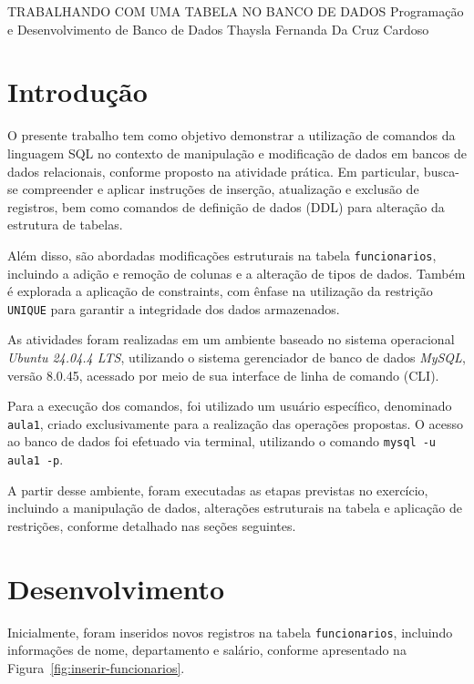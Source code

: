 \documentclass[12pt,a4paper]{article}
\begin{document}
\montarinicio
    {TRABALHANDO COM UMA TABELA NO BANCO DE DADOS}
    {Programação e Desenvolvimento de Banco de Dados}
    {Thaysla Fernanda Da Cruz Cardoso}

\section{Introdução}

O presente trabalho tem como objetivo demonstrar a utilização de comandos da linguagem SQL no contexto de manipulação e modificação de dados em bancos de dados relacionais, conforme proposto na atividade prática. Em particular, busca-se compreender e aplicar instruções de inserção, atualização e exclusão de registros, bem como comandos de definição de dados (DDL) para alteração da estrutura de tabelas.

Além disso, são abordadas modificações estruturais na tabela \texttt{funcionarios}, incluindo a adição e remoção de colunas e a alteração de tipos de dados. Também é explorada a aplicação de constraints, com ênfase na utilização da restrição \texttt{UNIQUE} para garantir a integridade dos dados armazenados.

As atividades foram realizadas em um ambiente baseado no sistema operacional \textit{Ubuntu 24.04.4 LTS}, utilizando o sistema gerenciador de banco de dados \textit{MySQL}, versão 8.0.45, acessado por meio de sua interface de linha de comando (CLI).

Para a execução dos comandos, foi utilizado um usuário específico, denominado \texttt{aula1}, criado exclusivamente para a realização das operações propostas. O acesso ao banco de dados foi efetuado via terminal, utilizando o comando \texttt{mysql -u aula1 -p}.

A partir desse ambiente, foram executadas as etapas previstas no exercício, incluindo a manipulação de dados, alterações estruturais na tabela e aplicação de restrições, conforme detalhado nas seções seguintes.

\section{Desenvolvimento}

Inicialmente, foram inseridos novos registros na tabela \texttt{funcionarios}, incluindo informações de nome, departamento e salário, conforme apresentado na Figura~\ref{fig:inserir-funcionarios}.
\end{document}
